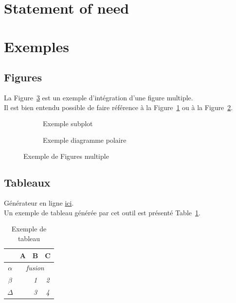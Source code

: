 \section{Statement of need}
\blindtext


\section{Exemples}

\FloatBarrier
\subsection{Figures}

La Figure~\ref{figure_multiple} est un exemple d'intégration d'une figure multiple. \\
Il est bien entendu possible de faire référence à la Figure~\ref{figure_subplot} ou à la Figure~\ref{figure_polaire}.

\begin{figure}[hbtp]
	\centering
	\begin{subfigure}[b]{0.8\textwidth}
		\centering
		\def\svgwidth{\columnwidth}
		\fontsize{10pt}{10pt}\selectfont
		\caption{Exemple subplot} 
		\label{figure_subplot}
	\end{subfigure}
	\qquad
	\begin{subfigure}[b]{0.7\textwidth}
		\centering
		\def\svgwidth{\columnwidth}
		\fontsize{10pt}{10pt}\selectfont
		\caption{Exemple diagramme polaire} 
		\label{figure_polaire}
	\end{subfigure}
	\caption{Exemple de Figures multiple} 
	\label{figure_multiple}
\end{figure}



\FloatBarrier
\subsection{Tableaux}

Générateur en ligne \href{http://www.tablesgenerator.com/latex_tables}{ici}. \\

Un exemple de tableau générée par cet outil est présenté Table~\ref{tableau_exemple}.

\begin{table}[]
\centering
\begin{tabular}{c|c|c|c|}
\cline{2-4}
                               & \textbf{A}                 & \textbf{B} & \textbf{C} \\ \hline
\multicolumn{1}{|c|}{$\alpha$} & \multicolumn{3}{c|}{\textit{fusion}}                 \\ \hline
\multicolumn{1}{|c|}{$\beta$}  & \multirow{2}{*}{\textit{}} & \textit{1} & \textit{2} \\ \cline{1-1} \cline{3-4} 
\multicolumn{1}{|c|}{$\Delta$} &                            & \textit{3} & \textit{4} \\ \hline
\end{tabular}
\caption{Exemple de tableau}
\label{tableau_exemple}
\end{table}


